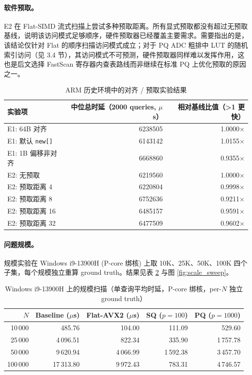 \documentclass[a4paper,11pt,UTF8]{ctexart}
\begin{document}
\paragraph{软件预取。}
E2 在 Flat-SIMD 流式扫描上尝试多种预取距离。所有显式预取都没有超过无预取基线，说明该访问模式足够顺序，硬件预取器已经覆盖主要需求。需要指出的是，该结论仅针对 Flat 的顺序扫描访问模式成立；对于 PQ ADC 粗排中 LUT 的随机索引访问（见 3.4 节），其访问模式不可预测，硬件预取器同样难以发挥作用，这也是后文选择 FastScan 寄存器内查表路线而非继续在标准 PQ 上优化预取的原因之一。

\begin{table}[H]
  \centering\small
  \begin{tabular}{lrr}
    \toprule
    实验项 & 中位总时延（2000 queries, $\mu$s） & 相对基线比值（>1 更快） \\
    \midrule
    E1: 64B 对齐 & 6238505 & 1.0000$\times$ \\
    E1: 默认 \texttt{new[]} & 6143142 & 1.0155$\times$ \\
    E1: 1B 偏移非对齐 & 6668860 & 0.9355$\times$ \\
    \midrule
    E2: 无预取 & 6219560 & 1.0000$\times$ \\
    E2: 预取距离 4 & 6220804 & 0.9998$\times$ \\
    E2: 预取距离 8 & 6752636 & 0.9211$\times$ \\
    E2: 预取距离 16 & 6485157 & 0.9591$\times$ \\
    E2: 预取距离 32 & 6477509 & 0.9602$\times$ \\
    \bottomrule
  \end{tabular}
  \caption{ARM 历史环境中的对齐 / 预取实验结果}
  \label{tab:align_prefetch}
\end{table}

\paragraph{问题规模。}
规模实验在 Windows i9-13900H (P-core 绑核) 上取 10K、25K、50K、100K 四个子集，每个规模独立重算 ground truth。结果见表 \ref{tab:scale_sweep} 与图 \ref{fig:scale_sweep}。

\begin{table}[H]
  \centering\small
  \begin{tabular}{rrrrr}
    \toprule
    $N$ & Baseline ($\mu$s) & Flat-AVX2 ($\mu$s) & SQ ($p=100$) & PQ ($p=1000$) \\
    \midrule
    10\,000  & 485.76   & 104.00  & 111.09  & 529.60 \\
    25\,000  & 4\,096.51 & 822.34  & 335.90  & 1\,757.78 \\
    50\,000  & 9\,620.94 & 4\,066.99 & 1\,592.38 & 3\,457.70 \\
    100\,000 & 17\,313.80 & 9\,972.43 & 783.31 & 4\,746.57 \\
    \bottomrule
  \end{tabular}
  \caption{Windows i9-13900H 上的规模扫描（单查询平均时延，P-core 绑核，per-$N$ 独立 ground truth）}
  \label{tab:scale_sweep}
\end{table}
\end{document}
